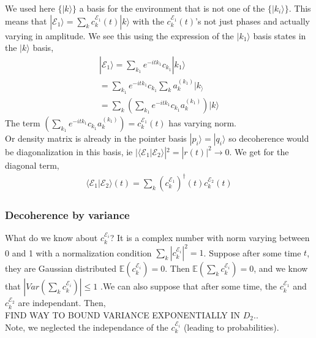 \documentclass{article}
\begin{document}
We used here $\{|k\rangle\}$ a basis for the environment that is not one of the $\{|k_i\rangle\}$. This means that $|\mathcal{E}_1\rangle=\sum_kc^{\mathcal{E}_1}_k(t)|k\rangle$ with the $c^{\mathcal{E}_1}_k(t)$'s not just phases and actually varying in amplitude. We see this using the expression of the $|k_1\rangle$ basis states in the $|k\rangle$ basis,
\begin{align}
    |\mathcal{E}_1\rangle=\sum_{k_1}e^{-itk_1}c_{k_1}|k_1\rangle\\
    =\sum_{k_1}e^{-itk_1}c_{k_1}\sum_ka^{(k_1)}_k|k_\rangle\\
    =\sum_k(\sum_{k_1}e^{-itk_1}c_{k_1}a^{(k_1)}_k)|k\rangle
\end{align}
The term $(\sum_{k_1}e^{-itk_1}c_{k_1}a^{(k_1)}_k)=c^{\mathcal{E}_1}_k(t)$ has varying norm. \\

Or density matrix is already in the pointer basis $|p_i\rangle=|q_i\rangle$ so decoherence would be diagonalization in this basis, ie $|\langle\mathcal{E}_1|\mathcal{E}_2\rangle|^2=|r(t)|^2\rightarrow0$. We get for the diagonal term,
\begin{align}
    \langle \mathcal{E}_1| \mathcal{E}_2\rangle(t) = \sum_k(c^{\mathcal{E}_1}_k)^{\dagger}(t)c^{\mathcal{E}_2}_k(t)
\end{align}



\subsubsection{Decoherence by variance}
What do we know about $c^{\mathcal{E}_i}_k$? It is a complex number with norm varying between 0 and 1 with a normalization condition $\sum_k|c^{\mathcal{E}_i}_k|^2=1$. Suppose after some time $t$, they are Gaussian distributed $\mathbb{E}(c^{\mathcal{E}_i}_k)=0$. Then $\mathbb{E}(\sum_kc^{\mathcal{E}_i}_k)=0$, and we know that $|Var(\sum_kc^{\mathcal{E}_i}_k)|\leq 1$ .We can also suppose that after some time, the $c^{\mathcal{E}_1}_k$ and $c^{\mathcal{E}_2}_k$ are independant. 
Then,\\
FIND WAY TO BOUND VARIANCE EXPONENTIALLY IN $D_2$..\\
Note, we neglected the independance of the $c^{\mathcal{E}_i}_k$ (leading to probabilities).\\
\end{document}
